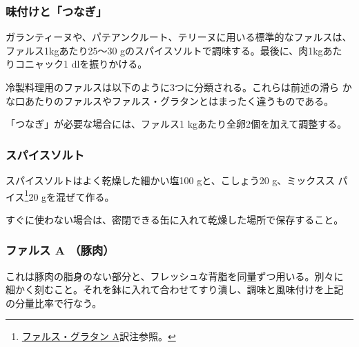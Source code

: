 \normalfont
\begin{recette}
\hypertarget{assaisonnement-et-liaison}{%
\subsubsection{味付けと「つなぎ」}\label{assaisonnement-et-liaison}}


ガランティーヌや、パテアンクルート、テリーヌに用いる標準的なファルスは、
ファルス1kgあたり25〜30 gのスパイスソルトで調味する。最後に、肉1kgあた
りコニャック1\undemi{} dlを振りかける。

冷製料理用のファルスは以下のように3つに分類される。これらは前述の滑ら
かな口あたりのファルスやファルス・グラタンとはまったく違うものである。

「つなぎ」が必要な場合には、ファルス1 kgあたり全卵2個を加えて調整する。

\hypertarget{sel-epice}{%
\subsubsection{スパイスソルト}\label{sel-epice}}


 

スパイスソルトはよく乾燥した細かい塩100 gと、こしょう20 g、ミックスス
パイス\footnote{\protect\hyperlink{farce-gratin-a}{ファルス・グラタン
  A}訳注参照。}20 gを混ぜて作る。

すぐに使わない場合は、密閉できる缶に入れて乾燥した場所で保存すること。

\hypertarget{farce-froide-a}{%
\subsubsection{ファルス A （豚肉）}\label{farce-froide-a}}



これは豚肉の脂身のない部分と、フレッシュな背脂を同量ずつ用いる。別々に
細かく刻むこと。それを鉢に入れて合わせてすり潰し、調味と風味付けを上記
の分量比率で行なう。


\end{recette}
